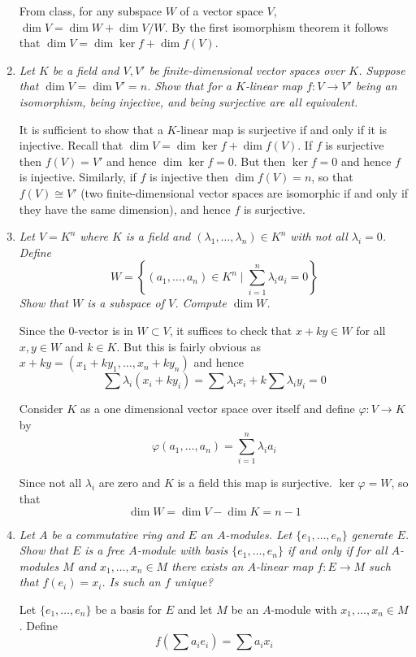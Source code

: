 \documentclass[10pt]{article}
\newcommand{\iso}{\cong}
\begin{document}
\begin{enumerate}
From class, for any subspace $W$ of a vector space $V$, $\dim V = \dim W + \dim V/W$.  By the first isomorphism theorem it follows that $\dim V = \dim \ker f + \dim f(V)$.

\item \emph{Let $K$ be a field and $V,V'$ be finite-dimensional vector spaces over $K$.  Suppose that $\dim V = \dim V' = n$.  Show that for a $K$-linear map $f: V \rightarrow V'$ being an isomorphism, being injective, and being surjective are all equivalent.}

It is sufficient to show that a $K$-linear map is surjective if and only if it is injective.  Recall that $\dim V = \dim \ker f + \dim f(V)$.  If $f$ is surjective then $f(V) = V'$ and hence $\dim \ker f = 0$.  But then $\ker f = 0$ and hence $f$ is injective.  Similarly, if $f$ is injective then $\dim f(V) = n$, so that $f(V) \iso V'$ (two finite-dimensional vector spaces are isomorphic if and only if they have the same dimension), and hence $f$ is surjective.

\item \emph{Let $V = K^n$ where $K$ is a field and $(\lambda_1, \ldots, \lambda_n) \in K^n$ with not all $\lambda_i = 0$.  Define $$W = \left\{(a_1, \ldots, a_n) \in K^n \mid \sum_{i=1}^n \lambda_i a_i = 0\right\}$$  Show that $W$ is a subspace of $V$.  Compute $\dim W$.}

Since the $0$-vector is in $W \subset V$, it suffices to check that $x + ky \in W$ for all $x,y \in W$ and $k \in K$.  But this is fairly obvious as $x + ky = (x_1 + ky_1, \ldots, x_n + ky_n)$ and hence
\[
\sum \lambda_i(x_i + ky_i) = \sum \lambda_ix_i + k \sum \lambda_i y_i = 0
\]

Consider $K$ as a one dimensional vector space over itself and define $\varphi: V \rightarrow K$ by
\[
\varphi(a_1, \ldots, a_n) = \sum_{i=1}^n \lambda_i a_i
\]

Since not all $\lambda_i$ are zero and $K$ is a field this map is surjective. $\ker \varphi = W$, so that
\[
\dim W = \dim V - \dim K = n - 1
\]

\item \emph{Let $A$ be a commutative ring and $E$ an $A$-modules.  Let $\{e_1, \ldots, e_n\}$ generate $E$.  Show that $E$ is a free $A$-module with basis $\{e_1, \ldots, e_n\}$ if and only if for all $A$-modules $M$ and $x_1, \ldots, x_n \in M$ there exists an $A$-linear map $f: E \rightarrow M$ such that $f(e_i) = x_i$.  Is such an $f$ unique?}

Let $\{e_1, \ldots, e_n\}$ be a basis for $E$ and let $M$ be an $A$-module with $x_1, \ldots, x_n \in M$.  Define
\[
f\left(\sum a_i e_i\right) = \sum a_i x_i
\]


\end{enumerate}
\end{document}
